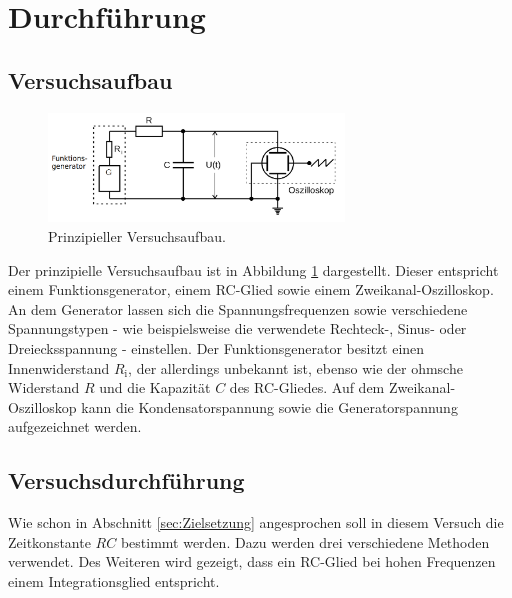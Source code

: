 \section{Durchführung}
\label{sec:Durchführung}

\subsection{Versuchsaufbau}
\label{sec:Versuchsaufbau}

\begin{figure}
	\caption{Prinzipieller Versuchsaufbau.}
	\label{fig:aufbauamk}
	\centering
	\includegraphics[width=0.7\textwidth]{bilder/generator.png}
\end{figure}

Der prinzipielle Versuchsaufbau ist in Abbildung \ref{fig:aufbauamk} dargestellt.
Dieser entspricht einem Funktionsgenerator, einem RC-Glied sowie einem Zweikanal-Oszilloskop.
An dem Generator lassen sich die Spannungsfrequenzen sowie verschiedene Spannungstypen - wie beispielsweise die verwendete Rechteck-, Sinus- oder Dreiecksspannung - einstellen.
Der Funktionsgenerator besitzt einen Innenwiderstand $R_{\text{i}}$, der allerdings unbekannt ist, ebenso wie der ohmsche Widerstand $R$ und die Kapazität $C$ des RC-Gliedes.
Auf dem Zweikanal-Oszilloskop kann die Kondensatorspannung sowie die Generatorspannung aufgezeichnet werden.

\subsection{Versuchsdurchführung}
\label{sec:Versuchsdurchführung}

Wie schon in Abschnitt \ref{sec:Zielsetzung} angesprochen soll in diesem Versuch die
Zeitkonstante $RC$ bestimmt werden.
Dazu werden drei verschiedene Methoden verwendet.
Des Weiteren wird gezeigt, dass ein RC-Glied bei hohen Frequenzen einem Integrationsglied entspricht.


